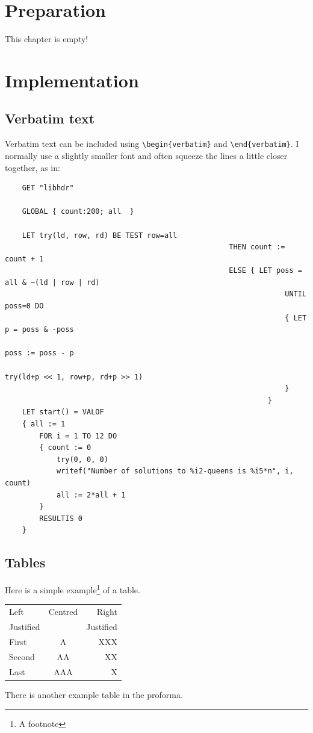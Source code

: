 \documentclass[12pt,a4paper,twoside,openright]{report}
\renewcommand{\baselinestretch}{1.1}    %
\begin{document}
	
	\chapter{Preparation}
	
	This chapter is empty!
	
	
	\chapter{Implementation}
	
	\section{Verbatim text}
	
	Verbatim text can be included using \verb|\begin{verbatim}| and
	\verb|\end{verbatim}|. I normally use a slightly smaller font and
	often squeeze the lines a little closer together, as in:
	
	{\renewcommand{\baselinestretch}{0.8}\small
	\begin{verbatim}
	GET "libhdr"
	 
	GLOBAL { count:200; all  }
	 
	LET try(ld, row, rd) BE TEST row=all
													THEN count := count + 1
													ELSE { LET poss = all & ~(ld | row | rd)
																 UNTIL poss=0 DO
																 { LET p = poss & -poss
																	 poss := poss - p
																	 try(ld+p << 1, row+p, rd+p >> 1)
																 }
															 }
	LET start() = VALOF
	{ all := 1
		FOR i = 1 TO 12 DO
		{ count := 0
			try(0, 0, 0)
			writef("Number of solutions to %i2-queens is %i5*n", i, count)
			all := 2*all + 1
		}
		RESULTIS 0
	}
	\end{verbatim}
	}
	
	\section{Tables}
	
	\begin{samepage}
	Here is a simple example\footnote{A footnote} of a table.
	
	\begin{center}
	\begin{tabular}{l|c|r}
	Left      & Centred & Right \\
	Justified &         & Justified \\[3mm]
	First     & A       & XXX \\
	Second    & AA      & XX  \\
	Last      & AAA     & X   \\
	\end{tabular}
	\end{center}
	
	\noindent
	There is another example table in the proforma.
	\end{samepage}
	
\end{document}
